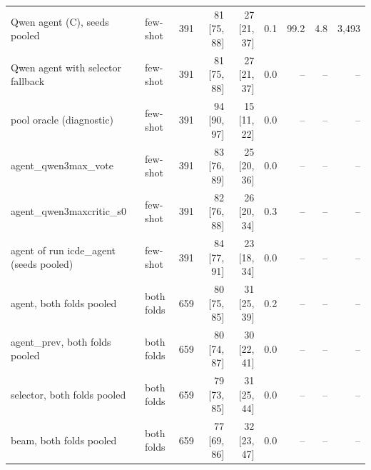 \begin{table}[t]
\begin{tabular}{llrrrrrrr}
Qwen agent (C), seeds pooled & few-shot & 391 & 81 [75, 88] & 27 [21, 37] & 0.1 & 99.2 & 4.8 & 3{,}493 \\
Qwen agent with selector fallback & few-shot & 391 & 81 [75, 88] & 27 [21, 37] & 0.0 & -- & -- & -- \\
pool oracle (diagnostic) & few-shot & 391 & 94 [90, 97] & 15 [11, 22] & 0.0 & -- & -- & -- \\
agent\_qwen3max\_vote & few-shot & 391 & 83 [76, 89] & 25 [20, 36] & 0.0 & -- & -- & -- \\
agent\_qwen3maxcritic\_s0 & few-shot & 391 & 82 [76, 88] & 26 [20, 34] & 0.3 & -- & -- & -- \\
agent of run icde\_agent (seeds pooled) & few-shot & 391 & 84 [77, 91] & 23 [18, 34] & 0.0 & -- & -- & -- \\
agent, both folds pooled & both folds & 659 & 80 [75, 85] & 31 [25, 39] & 0.2 & -- & -- & -- \\
agent\_prev, both folds pooled & both folds & 659 & 80 [74, 87] & 30 [22, 41] & 0.0 & -- & -- & -- \\
selector, both folds pooled & both folds & 659 & 79 [73, 85] & 31 [25, 44] & 0.0 & -- & -- & -- \\
beam, both folds pooled & both folds & 659 & 77 [69, 86] & 32 [23, 47] & 0.0 & -- & -- & -- \\
\bottomrule\end{tabular}
\end{table}
